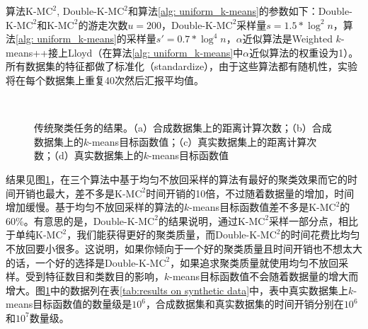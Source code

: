 算法K-M$\text{C}^2$, Double-K-M$\text{C}^2$和算法\ref{alg: uniform_k-means}的参数如下：Double-K-M$\text{C}^2$和K-M$\text{C}^2$的游走次数$u = 200$，Double-K-M$\text{C}^2$采样量$s = 1.5*\log^2 n$，算法\ref{alg: uniform_k-means}的采样量$s' = 0.7*\log^4 n$，$\alpha$近似算法是Weighted $k$-means++接上Lloyd（在算法\ref{alg: uniform_k-means}中$\alpha$近似算法的权重设为1）。所有数据集的特征都做了标准化（standardize），由于这些算法都有随机性，实验将在每个数据集上重复40次然后汇报平均值。
\begin{figure}[h]
     \\
    \caption{传统聚类任务的结果。（a）合成数据集上的距离计算次数；（b）合成数据集上的$k$-means目标函数值；（c）真实数据集上的距离计算次数；（d）真实数据集上的$k$-means目标函数值}
    \label{fig: kmeans-experiments}
\end{figure}
结果见图\ref{fig: kmeans-experiments}，在三个算法中基于均匀不放回采样的算法有最好的聚类效果而它的时间开销也最大，差不多是K-M$\text{C}^2$时间开销的10倍，不过随着数据量的增加，时间增加缓慢。基于均匀不放回采样的算法的$k$-means目标函数值差不多是K-M$\text{C}^2$的60\%。有意思的是，Double-K-M$\text{C}^2$的结果说明，通过K-M$\text{C}^2$采样一部分点，相比于单纯K-M$\text{C}^2$，我们能获得更好的聚类质量，而Double-K-M$\text{C}^2$的时间花费比均匀不放回要小很多。这说明，如果你倾向于一个好的聚类质量且时间开销也不想太大的话，一个好的选择是Double-K-M$\text{C}^2$，如果追求聚类质量就使用均匀不放回采样。受到特征数目和类数目的影响，$k$-means目标函数值不会随着数据量的增大而增大。图\ref{fig: kmeans-experiments}中的数据列在表\ref{tab:results on synthetic data}中，表中真实数据集上$k$-means目标函数值的数量级是$10^6$，合成数据集和真实数据集的时间开销分别在$10^6$和$10^7$数量级。

